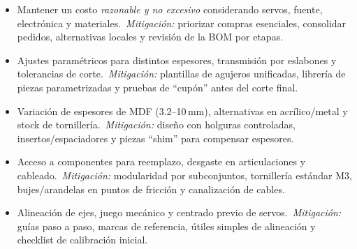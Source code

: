 \begin{itemize}
  \item Mantener un costo \emph{razonable y no excesivo} considerando servos, fuente, electrónica y materiales.\ \emph{Mitigación:} priorizar compras esenciales, consolidar pedidos, alternativas locales y revisión de la BOM por etapas.
  
  \item Ajustes paramétricos para distintos espesores, transmisión por eslabones y tolerancias de corte.\ \emph{Mitigación:} plantillas de agujeros unificadas, librería de piezas parametrizadas y pruebas de “cupón” antes del corte final.
  
  
  \item Variación de espesores de MDF (3.2--10\,mm), alternativas en acrílico/metal y stock de tornillería.\ \emph{Mitigación:} diseño con holguras controladas, insertos/espaciadores y piezas “shim” para compensar espesores.
  
  \item Acceso a componentes para reemplazo, desgaste en articulaciones y cableado.\ \emph{Mitigación:} modularidad por subconjuntos, tornillería estándar M3, bujes/arandelas en puntos de fricción y canalización de cables.
  
  \item Alineación de ejes, juego mecánico y centrado previo de servos.\ \emph{Mitigación:} guías paso a paso, marcas de referencia, útiles simples de alineación y checklist de calibración inicial.
\end{itemize}



